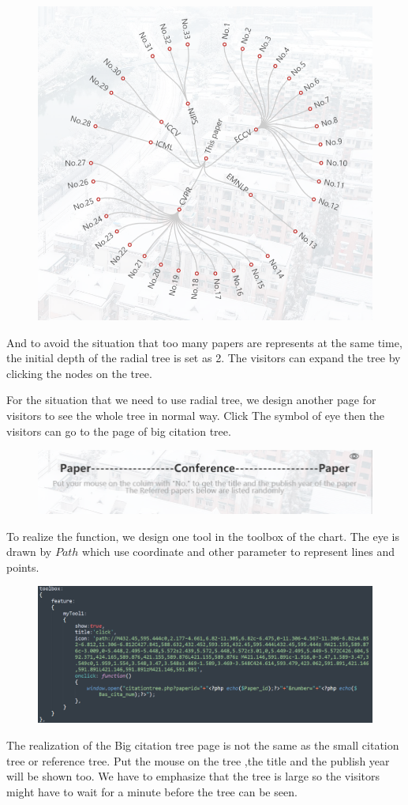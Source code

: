 \documentclass{article}
\begin{document}
\begin{figure}[H]
{			\begin{minipage}[h]{0.33\linewidth}
				\centering
				\includegraphics[width=0.8\linewidth]{p_36.png}
			\end{minipage}%
		}%
	\end{figure}
	And to avoid the situation that too many papers are represents at the same time, the initial depth of the radial tree is set as 2. The visitors can expand the tree by clicking the nodes on the tree.
	\par For the situation that we need to use radial tree, we design another page for visitors to see the whole tree in normal way. Click The symbol of eye then the visitors can go to the page of big citation tree.
	\begin{figure}[H]
		\centering
		\includegraphics[width=0.75\linewidth]{P_38.png}
	\end{figure}
	To realize the function, we design one tool in the toolbox of the chart. The eye is drawn by \(Path\) which use coordinate and other parameter to represent lines and points.
	\begin{figure}[H]
		\centering
		\includegraphics[width=0.8\linewidth]{P_39.png}
	\end{figure}
	The realization of the Big citation tree page is not the same as the small citation tree or reference tree. Put the mouse on the tree ,the title and the publish year will be shown too. We have to emphasize that the tree is large so the visitors might have to wait for a minute before the tree can be seen.
\end{document}
